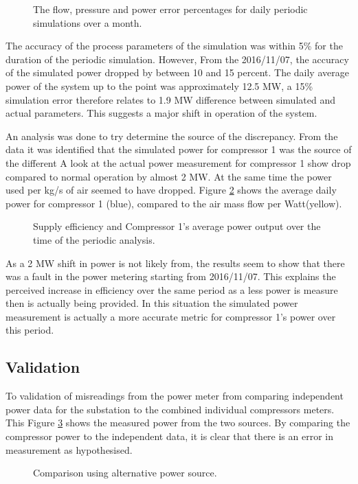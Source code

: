 	\begin{figure}[h]
		\centering
		
		\caption{The flow, pressure and power error percentages for daily periodic simulations over a month.}
		\label{fig: Periodic simulation}
	\end{figure}   
The accuracy of the process parameters of the simulation was within 5\% for the duration of the periodic simulation. However, From the 2016/11/07, the accuracy of the simulated power dropped by between 10 and 15 percent. The daily average power of the system up to the point was approximately 12.5 MW, a 15\% simulation error therefore relates to 1.9 MW difference between simulated and actual parameters. This suggests a major shift in operation of the system.
\par 
An analysis was done to try determine the source of the discrepancy. From the data it was identified that the simulated power for compressor 1 was the source of the different A look at the actual power measurement for compressor 1 show drop compared to normal operation by almost 2 MW. At the same time the power used per kg/s of air seemed to have dropped. Figure \ref{fig: MeasurementAccuracy.} shows the average daily power for compressor 1 (blue), compared to the air mass flow per Watt(yellow). 
	\begin{figure}[h]
		\centering
		
		\caption{Supply efficiency and Compressor 1's average power output over the time of the periodic analysis.}
		\label{fig: MeasurementAccuracy.}
	\end{figure} 
As a 2 MW shift in power is not likely from, the results seem to show that there was a fault in the power metering starting from 2016/11/07. This explains the perceived increase in efficiency over the same period as a less power is measure then is actually being provided. In this situation the simulated power measurement is actually a more accurate metric for compressor 1's power over this period.  
   \subsection{Validation}
To validation of misreadings from the power meter from comparing independent power data for the substation to the combined individual compressors meters. This Figure \ref{fig: Corrected Periodic simulation} shows the measured power from the two sources. By comparing the compressor power to the independent data, it is clear that there is an error in measurement as hypothesised.
	\begin{figure}[h]
		\centering
		
		\caption{Comparison using alternative power source.}
		\label{fig: Corrected Periodic simulation}
	\end{figure}    
	
